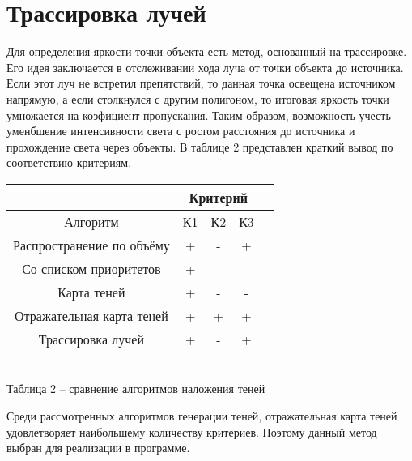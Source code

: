 {    \section {Трассировка лучей} {
        Для определения яркости точки объекта есть метод, основанный на
        трассировке.
        Его идея заключается в отслеживании хода луча от точки объекта до
        источника.
        Если этот луч не встретил препятствий, то данная точка освещена
        источником напрямую, а если столкнулся с другим полигоном, то итоговая
        яркость точки умножается на коэфициент пропускания.
        Таким образом, возможность учесть уменбшение интенсивности света с
        ростом расстояния до источника и прохождение света через объекты.
    }
    \vspace{5mm}
    В таблице 2 представлен краткий вывод по соответствию критериям.
    \begin{center}
        \begin{tabular} { |c|c|c|c|c| }
            \hline
            \hspace{0pt} & \multicolumn{3}{|c|}{Критерий} \\
            \hline
            Алгоритм & К1 & К2 & К3 \\
            \hline
            Распространение по объёму & + & - & + \\
            \hline
            Со списком приоритетов & + & - & -  \\
            \hline
            Карта теней & + & - & - \\
            \hline
            Отражательная карта теней & + & + & + \\
            \hline
            Трассировка лучей & + & - & + \\
            \hline
        \end{tabular}
        \\
        \vspace{2mm}
        \small { Таблица 2 -- сравнение алгоритмов наложения теней }
    \end{center}
    
    \hspace{1.25cm}
    Среди рассмотренных алгоритмов генерации теней, отражательная карта теней
    удовлетворяет наибольшему количеству критериев.
    Поэтому данный метод выбран для реализации в программе.
}